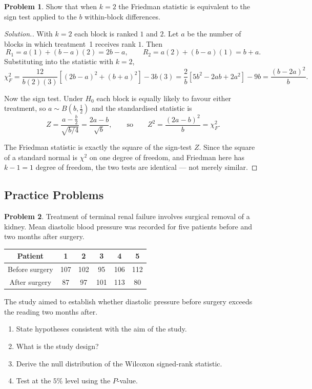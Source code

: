 \documentclass[11pt,a4paper]{article}
\theoremstyle{definition}
\newtheorem{problemx}{Problem}[section]
\newenvironment{problem}{\begin{problemx}}{\end{problemx}}
\newenvironment{solution}
  {\renewcommand{\qedsymbol}{}\begin{proof}[\textit{Solution}.]}
  {\end{proof}}
\begin{document}
\begin{problem}
Show that when $k = 2$ the Friedman statistic is equivalent to the sign test
applied to the $b$ within-block differences.
\end{problem}

\begin{solution}
With $k = 2$ each block is ranked $1$ and $2$. Let $a$ be the number of blocks in
which treatment~1 receives rank $1$. Then
$$R_1 = a(1) + (b-a)(2) = 2b - a,\qquad R_2 = a(2) + (b-a)(1) = b + a .$$
Substituting into the statistic with $k = 2$,
$$\chi^{2}_{F} = \dfrac{12}{b(2)(3)}\left[(2b-a)^{2} + (b+a)^{2}\right] - 3b(3)
= \dfrac{2}{b}\left[5b^{2} - 2ab + 2a^{2}\right] - 9b
= \dfrac{(b - 2a)^{2}}{b}.$$

Now the sign test. Under $H_0$ each block is equally likely to favour either
treatment, so $a \sim B\!\left(b, \tfrac12\right)$ and the standardised statistic
is
$$Z = \dfrac{a - \frac{b}{2}}{\sqrt{b/4}} = \dfrac{2a - b}{\sqrt{b}},
\qquad\text{so}\qquad Z^{2} = \dfrac{(2a-b)^{2}}{b} = \chi^{2}_{F}.$$

The Friedman statistic is exactly the square of the sign-test $Z$. Since the
square of a standard normal is $\chi^{2}$ on one degree of freedom, and Friedman
here has $k - 1 = 1$ degree of freedom, the two tests are identical --- not merely
similar.
\end{solution}


\subsection{Practice Problems}

\begin{problem}
Treatment of terminal renal failure involves surgical removal of a kidney. Mean
diastolic blood pressure was recorded for five patients before and two months after
surgery.
\begin{center}
\begin{tabular}{|c|c|c|c|c|c|}
\hline
Patient & 1 & 2 & 3 & 4 & 5\\
\hline
Before surgery & 107 & 102 & 95 & 106 & 112\\
\hline
After surgery & 87 & 97 & 101 & 113 & 80\\
\hline
\end{tabular}
\end{center}
The study aimed to establish whether diastolic pressure before surgery exceeds the
reading two months after.
\begin{enumerate}
\item[(a).] State hypotheses consistent with the aim of the study.
\item[(b).] What is the study design?
\item[(c).] Derive the null distribution of the Wilcoxon signed-rank statistic.
\item[(d).] Test at the $5\%$ level using the $P$-value.
\end{enumerate}
\end{problem}
\end{document}
